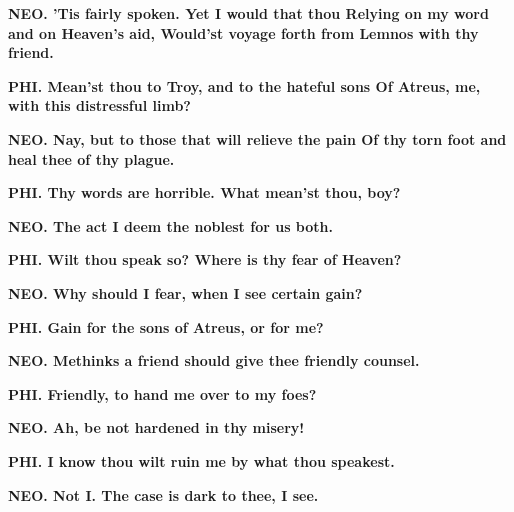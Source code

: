 \documentclass[11pt,letter]{book}
\begin{document}
\par \textbf{NEO. ’Tis fairly spoken. Yet I would that thou Relying on my word and on Heaven’s aid, Would’st voyage forth from Lemnos with thy friend.}
\par 

\par \textbf{PHI. Mean’st thou to Troy, and to the hateful sons Of Atreus, me, with this distressful limb?}
\par 

\par \textbf{NEO. Nay, but to those that will relieve the pain Of thy torn foot and heal thee of thy plague.}
\par 

\par \textbf{PHI. Thy words are horrible. What mean’st thou, boy?}
\par 

\par \textbf{NEO. The act I deem the noblest for us both.}
\par 

\par \textbf{PHI. Wilt thou speak so? Where is thy fear of Heaven?}
\par 

\par \textbf{NEO. Why should I fear, when I see certain gain?}
\par 

\par \textbf{PHI. Gain for the sons of Atreus, or for me?}
\par 

\par \textbf{NEO. Methinks a friend should give thee friendly counsel.}
\par 

\par \textbf{PHI. Friendly, to hand me over to my foes?}
\par 

\par \textbf{NEO. Ah, be not hardened in thy misery!}
\par 

\par \textbf{PHI. I know thou wilt ruin me by what thou speakest.}
\par 

\par \textbf{NEO. Not I. The case is dark to thee, I see.}
\par 
\end{document}
